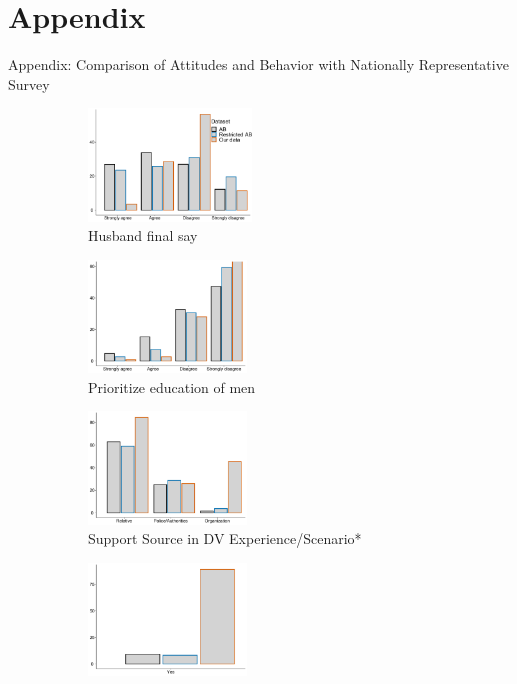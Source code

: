 \documentclass[10pt]{beamer}
\begin{document}
\section{Appendix}
\begin{frame}{Appendix: Comparison of Attitudes and Behavior with Nationally Representative Survey}
\begin{figure}[H]
\caption{Comparison of Attitudes and Behavior with general (Arab Barometer) population \\}
   \begin{minipage}{0.8\textwidth} 
\begin{subfigure}{0.5\textwidth}
  \includegraphics[height=3cm,width=4cm\linewidth]{Figures/AB/grey_solid/husb_fs.pdf} 
    \caption{Husband final say} 
    \label{} 
\end{subfigure}\hfil
\begin{subfigure}{0.5\textwidth}
  \includegraphics[height=3cm,width=4cm\linewidth]{Figures/AB/grey_solid/prio_educ.pdf} 
    \caption{Prioritize education of men} 
    \label{} 
\end{subfigure}\hfil
\begin{subfigure}{0.5\textwidth}
  \includegraphics[height=3cm,width=4cm\linewidth]{Figures/AB/grey_solid/support.pdf} 
    \caption{Support Source in DV Experience/Scenario*} 
    \label{} 
    \end{subfigure}\hfil
    \begin{subfigure}{0.5\textwidth}
    \includegraphics[height=3cm,width=4cm\linewidth]{Figures/AB/grey_solid/violence.pdf} 

\end{subfigure}
\end{minipage}
\end{figure}
\end{frame}
\end{document}
